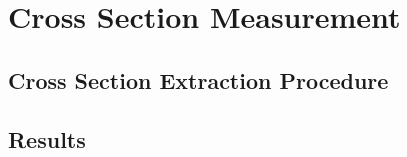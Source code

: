 \documentclass[../main.tex]{subfiles}
\begin{document}
\section{Cross Section Measurement}
\label{sec:xsec}

\subsection{Cross Section Extraction Procedure}
\subsection{Results}
\end{document}
